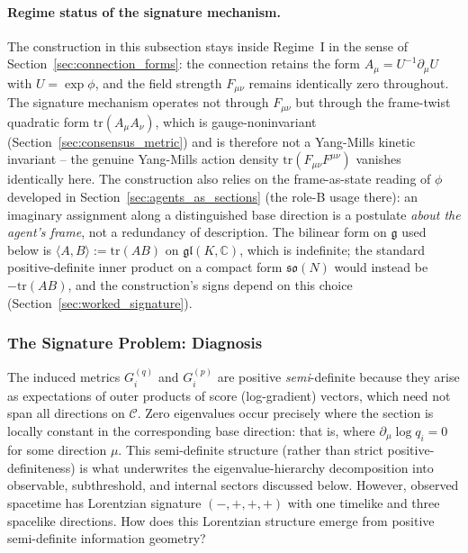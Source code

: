 \documentclass[11pt]{article}
\begin{document}
\paragraph{Regime status of the signature mechanism.} The construction in this subsection stays inside Regime~I in the sense of Section~\ref{sec:connection_forms}: the connection retains the form $A_\mu = U^{-1}\partial_\mu U$ with $U = \exp\phi$, and the field strength $F_{\mu\nu}$ remains identically zero throughout. The signature mechanism operates not through $F_{\mu\nu}$ but through the frame-twist quadratic form $\mathrm{tr}(A_\mu A_\nu)$, which is gauge-noninvariant (Section~\ref{sec:consensus_metric}) and is therefore not a Yang-Mills kinetic invariant -- the genuine Yang-Mills action density $\mathrm{tr}(F_{\mu\nu}F^{\mu\nu})$ vanishes identically here. The construction also relies on the frame-as-state reading of $\phi$ developed in Section~\ref{sec:agents_as_sections} (the role-B usage there): an imaginary assignment along a distinguished base direction is a postulate \emph{about the agent's frame}, not a redundancy of description. The bilinear form on $\mathfrak{g}$ used below is $\langle A, B\rangle := \mathrm{tr}(AB)$ on $\mathfrak{gl}(K, \mathbb{C})$, which is indefinite; the standard positive-definite inner product on a compact form $\mathfrak{so}(N)$ would instead be $-\mathrm{tr}(AB)$, and the construction's signs depend on this choice (Section~\ref{sec:worked_signature}).

\subsubsection{The Signature Problem: Diagnosis}

The induced metrics $G_i^{(q)}$ and $G_i^{(p)}$ are positive \emph{semi}-definite because they arise as expectations of outer products of score (log-gradient) vectors, which need not span all directions on $\mathcal{C}$. Zero eigenvalues occur precisely where the section is locally constant in the corresponding base direction: that is, where $\partial_\mu \log q_i = 0$ for some direction $\mu$. This semi-definite structure (rather than strict positive-definiteness) is what underwrites the eigenvalue-hierarchy decomposition into observable, subthreshold, and internal sectors discussed below. However, observed spacetime has Lorentzian signature $(-,+,+,+)$ with one timelike and three spacelike directions. How does this Lorentzian structure emerge from positive semi-definite information geometry?
\end{document}
